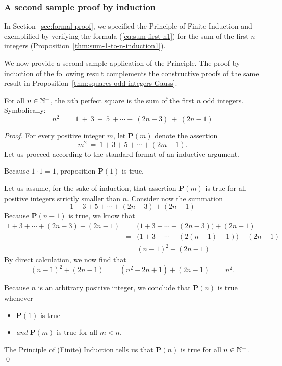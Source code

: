 \subsubsection{A second sample proof by induction}

In Section~\ref{sec:formal-proof}, we specified the Principle of
Finite Induction  and
exemplified by verifying the formula (\ref{eq:sum-first-n1}) for the
sum of the first $n$ integers
(Proposition~\ref{thm:sum-1-to-n-induction1}).

We now provide a second sample application of the Principle.  The
proof by induction of the following result complements the
constructive proofs of the same result in
Proposition~\ref{thm:squares-odd-integers-Gauss}.

\begin{prop}
\label{thm:squares-odd-integers-induction1}
For all $n \in \mathbb{N}^+$, the $n$th perfect square is the sum of the first
$n$ odd integers.  Symbolically:
\[
n^2 \ \ = \ \
1 \ + \ 3 \ + \ 5 \ + \cdots + \ (2n-3) \ + \ (2n-1)
\]
\end{prop}

\begin{proof}
For every positive integer $m$, let {\bf P}$(m)$ denote the assertion
\[ m^2 \ = \ 1 + 3 + 5 + \cdots + (2m-1). \]
Let us proceed according to the standard format of an inductive
argument.

Because $1 \cdot 1 = 1$, proposition {\bf P}$(1)$ is true.

Let us assume, for the sake of induction, that assertion {\bf
  P}$(m)$ is true for all positive integers strictly smaller than $n$.
Consider now the summation
\[ 1 + 3 + 5 + \cdots + (2n-3) + (2n-1) \]
Because {\bf P}$(n-1)$ is true, we know that
\begin{eqnarray*}
1 + 3 + \cdots + (2n-3) + (2n-1)
  & = & 
\big(1 + 3 + \cdots + (2n-3) \big) + (2n-1) \\
  & = &
\big(1 + 3 + \cdots + (2(n-1) -1) \big) + (2n-1) \\
  & = & (n-1)^2 + (2n-1)
\end{eqnarray*}
By direct calculation, we now find that
\[ (n-1)^2 + (2n-1) \ \ = \ \ (n^2 -2n +1) + (2n-1) \ \ = \ \ n^2. \]

\noindent
Because $n$ is an arbitrary positive integer, we conclude that
{\bf P}$(n)$ is true whenever
\begin{itemize}
\item
{\bf P}$(1)$ is true
\item
{\em and}
{\bf P}$(m)$ is true for all $m < n$.
\end{itemize}
The Principle of (Finite) Induction tells us that {\bf P}$(n)$
is true for all $n \in \mathbb{N}^+$.  \qed
\end{proof}


